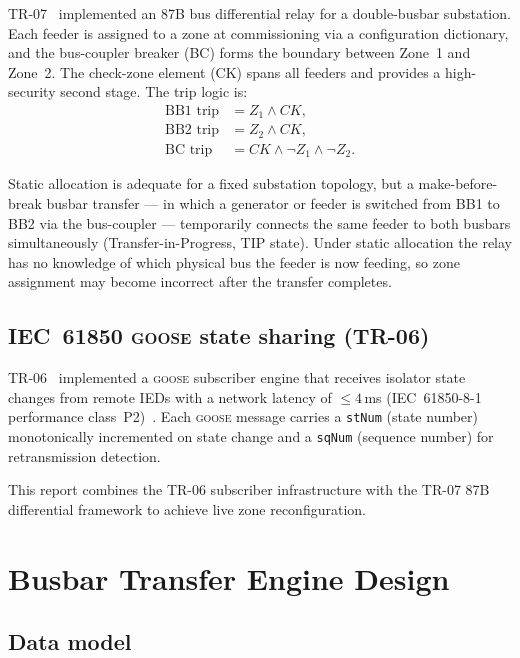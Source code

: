 \documentclass[11pt,a4paper]{article}
\newcommand{\goose}{\textsc{goose}}
\begin{document}
TR-07~\cite{SAMBP_TR07} implemented an 87B bus differential relay for a
double-busbar substation.  Each feeder is assigned to a zone at
commissioning via a configuration dictionary, and the bus-coupler breaker
(BC) forms the boundary between Zone~1 and Zone~2.  The check-zone element
(CK) spans all feeders and provides a high-security second stage.  The trip
logic is:
\begin{align}
  \text{BB1 trip} &= Z_1 \wedge CK, \label{eq:bb1}\\
  \text{BB2 trip} &= Z_2 \wedge CK, \label{eq:bb2}\\
  \text{BC trip}  &= CK \wedge \neg Z_1 \wedge \neg Z_2. \label{eq:bc}
\end{align}

Static allocation is adequate for a fixed substation topology, but a
make-before-break busbar transfer --- in which a generator or feeder is
switched from BB1 to BB2 via the bus-coupler --- temporarily connects the
same feeder to both busbars simultaneously (Transfer-in-Progress, TIP
state).  Under static allocation the relay has no knowledge of which
physical bus the feeder is now feeding, so zone assignment may become
incorrect after the transfer completes.

\subsection{IEC~61850 \goose{} state sharing (TR-06)}

TR-06~\cite{SAMBP_TR06} implemented a \goose{} subscriber engine that
receives isolator state changes from remote IEDs with a network latency of
$\leq 4$\,ms (IEC~61850-8-1 performance class~P2)~\cite{IEC61850_8_1}.
Each \goose{} message carries a \texttt{stNum} (state number) monotonically
incremented on state change and a \texttt{sqNum} (sequence number) for
retransmission detection.

This report combines the TR-06 subscriber infrastructure with the TR-07
87B differential framework to achieve live zone reconfiguration.

\section{Busbar Transfer Engine Design}
\label{sec:engine}

\subsection{Data model}
\end{document}
